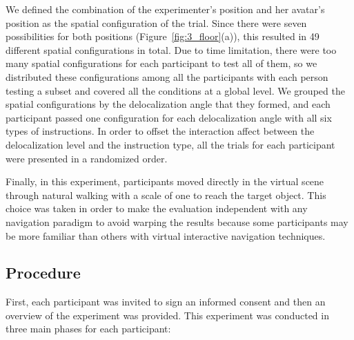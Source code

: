 We defined the combination of the experimenter's position and her avatar's position as the spatial configuration of the trial. Since there were seven possibilities for both positions (Figure~\ref{fig:3_floor}(a)), this resulted in 49 different spatial configurations in total. Due to time limitation, there were too many spatial configurations for each participant to test all of them, so we distributed these configurations among all the participants with each person testing a subset and covered all the conditions at a global level. We grouped the spatial configurations by the delocalization angle that they formed, and each participant passed one configuration for each delocalization angle with all six types of instructions. In order to offset the interaction affect between the delocalization level and the instruction type, all the trials for each participant were presented in a randomized order.

Finally, in this experiment, participants moved directly in the virtual scene through natural walking with a scale of one to reach the target object. This choice was taken in order to make the evaluation independent with any navigation paradigm to avoid warping the results because some participants may be more familiar than others with virtual interactive navigation techniques.


\subsection{Procedure}
First, each participant was invited to sign an informed consent and then an overview of the experiment was provided. This experiment was conducted in three main phases for each participant:

